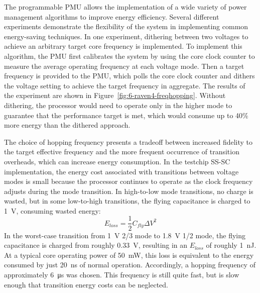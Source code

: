 \documentclass[graybox]{svmult}
\begin{document}
The programmable PMU allows the implementation of a wide variety of power management algorithms to improve energy efficiency.
Several different experiments demonstrate the flexibility of the system in implementing common energy-saving techniques.
In one experiment, dithering between two voltages to achieve an arbitrary target core frequency is implemented.
To implement this algorithm, the PMU first calibrates the system by using the core clock counter to measure the average operating frequency at each voltage mode.
Then a target frequency is provided to the PMU, which polls the core clock counter and dithers the voltage setting to achieve the target frequency in aggregate.
The results of the experiment are shown in Figure~\ref{fig:6-raven4-freqhopping}.
Without dithering, the processor would need to operate only in the higher mode to guarantee that the performance target is met, which would consume up to 40\% more energy than the dithered approach.

The choice of hopping frequency presents a tradeoff between increased fidelity to the target effective frequency and the more frequent occurrence of transition overheads, which can increase energy consumption.
In the testchip SS-SC implementation, the energy cost associated with transitions between voltage modes is small because the processor continues to operate as the clock frequency adjusts during the mode transition.
In high-to-low mode transitions, no charge is wasted, but in some low-to-high transitions, the flying capacitance is charged to \SI{1}{\volt}, consuming wasted energy:
\begin{equation}
E_{loss}=\frac{1}{2}C_{fly}\Delta V^2
\end{equation}
In the worst-case transition from \SI{1}{\volt} 2/3 mode to \SI{1.8}{\volt} 1/2 mode, the flying capacitance is charged from roughly \SI{0.33}{\volt}, resulting in an $E_{loss}$ of roughly \SI{1}{\nano\joule}.
At a typical core operating power of \SI{50}{\milli\watt}, this loss is equivalent to the energy consumed by just \SI{20}{\nano\second} of normal operation.
Accordingly, a hopping frequency of approximately \SI{6}{\micro\second} was chosen.
This frequency is still quite fast, but is slow enough that transition energy costs can be neglected.
\end{document}
